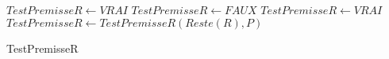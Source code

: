 \documentclass{article}
\begin{document}
\begin{algorithm}
    \SetAlgoLined

    \begin{algorithmic}

         \THEN
            \STATE $TestPremisseR \gets VRAI$
        \ENDIF
         \THEN
            \STATE $TestPremisseR \gets FAUX$
        \ELSE
                \STATE $TestPremisseR \gets VRAI$
            \ELSE
                \STATE $TestPremisseR \gets TestPremisseR(Reste(R),P)$
            \ENDIF
        \ENDIF


    \end{algorithmic}
    \caption{TestPremisseR}
\end{algorithm}
\end{document}
